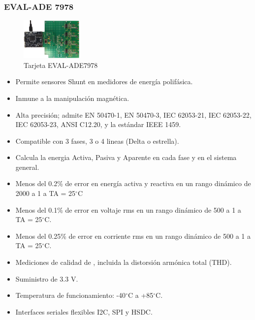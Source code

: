 \subsubsection{EVAL-ADE 7978}
\begin{figure}[H]
\centering
\includegraphics[width = 3cm]{3Proyecto/EVAL-ADE7978}
\caption{Tarjeta EVAL-ADE7978} 
\label{fig:EVAL-ADE7978}
\end{figure}
\begin{itemize}
\itemsep0em
\item Permite sensores Shunt en medidores de energía polifásica. 
\item Inmune a la manipulación magnética.
\item Alta precisión; admite EN 50470-1, EN 50470-3, IEC 62053-21, IEC 62053-22, IEC 62053-23, ANSI C12.20, y la estándar IEEE 1459.
\item Compatible con 3 fases, 3 o 4 lineas (Delta o estrella).
\item Calcula la energia Activa, Pasiva y Aparente en cada fase y en el sistema general.
\item Menos del 0.2\% de error en energía activa y reactiva en un rango dinámico de 2000 a 1 a TA = 25$^{\circ}$C
\item Menos del 0.1\% de error en voltaje rms en un rango dinámico de 500 a 1 a TA = 25$^{\circ}$C.
\item Menos del 0.25\% de error en corriente rms en un rango dinámico de 500 a 1 a TA = 25$^{\circ}$C.
\item Mediciones de calidad  de , incluida  la distorsión armónica total (THD).
\item Suministro de 3.3 V.
\item Temperatura de funcionamiento: -40$^{\circ}$C a +85$^{\circ}$C. 
\item Interfaces seriales flexibles I2C, SPI y HSDC.
\end{itemize}
